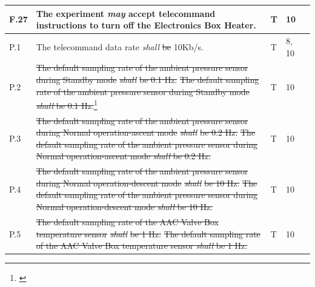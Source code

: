 \documentclass[a4paper,12pt,twoside]{article}
\providecommand{\DIFaddtex}[1]{{\protect\color{blue}\uwave{#1}}} %
\providecommand{\DIFdeltex}[1]{{\protect\color{red}\sout{#1}}}                      %
\providecommand{\DIFaddbegin}{} %
\providecommand{\DIFaddend}{} %
\providecommand{\DIFdelbegin}{} %
\providecommand{\DIFdelend}{} %
\providecommand{\DIFadd}[1]{\texorpdfstring{\DIFaddtex{#1}}{#1}} %
\providecommand{\DIFdel}[1]{\texorpdfstring{\DIFdeltex{#1}}{}} %
\newcommand{\DIFscaledelfig}{0.5}
\newlength{\DIFdelgraphicswidth} %
\newlength{\DIFdelgraphicsheight} %
\newcommand{\DIFaddincludegraphics}[2][]{{\color{blue}\fbox{\DIFOincludegraphics[#1]{#2}}}} %
\newcommand{\DIFdelincludegraphics}[2][]{%
\sbox{\DIFdelgraphicsbox}{\DIFOincludegraphics[#1]{#2}}%
\settoboxwidth{\DIFdelgraphicswidth}{\DIFdelgraphicsbox} %
\settoboxtotalheight{\DIFdelgraphicsheight}{\DIFdelgraphicsbox} %
\scalebox{\DIFscaledelfig}{%
\parbox[b]{\DIFdelgraphicswidth}{\usebox{\DIFdelgraphicsbox}\\[-\baselineskip] \rule{\DIFdelgraphicswidth}{0em}}\llap{\resizebox{\DIFdelgraphicswidth}{\DIFdelgraphicsheight}{%
\setlength{\unitlength}{\DIFdelgraphicswidth}%
\begin{picture}(1,1)%
\thicklines\linethickness{2pt} %
{\color[rgb]{1,0,0}\put(0,0){\framebox(1,1){}}}%
{\color[rgb]{1,0,0}\put(0,0){\line( 1,1){1}}}%
{\color[rgb]{1,0,0}\put(0,1){\line(1,-1){1}}}%
\end{picture}%
}\hspace*{3pt}}} %
} %
\DeclareRobustCommand{\DIFaddbegin}{\DIFOaddbegin \let\includegraphics\DIFaddincludegraphics} %
\DeclareRobustCommand{\DIFaddend}{\DIFOaddend \let\includegraphics\DIFOincludegraphics} %
\DeclareRobustCommand{\DIFdelbegin}{\DIFOdelbegin \let\includegraphics\DIFdelincludegraphics} %
\DeclareRobustCommand{\DIFdelend}{\DIFOaddend \let\includegraphics\DIFOincludegraphics} %
\begin{document}
\begin{longtable}[]{|m{}| m{} |m{} |m{}|m{}|}
F.27 & The experiment \textit{may} accept telecommand instructions to turn off the Electronics Box Heater.                                                                                   &      T        & 10            &        \\ \hline
P.1  & The telecommand data rate \textit{shall} \DIFdelbegin \DIFdel{be }\DIFdelend \DIFaddbegin \DIFadd{not be over }\DIFaddend 10Kb/s.                                                                                                                          &        T      & 8, 10            &        \\ \hline
P.2  & \DIFdelbegin \DIFdel{The default sampling rate of the ambient pressure sensor during Standby mode }\textit{\DIFdel{shall}} %
\DIFdel{be 0.1 Hz.                                                                           }\DIFdelend \DIFaddbegin \st{The default sampling rate of the ambient pressure sensor during Standby mode \textit{shall} be 0.1 Hz.}\footnote{\DIFadd{Replaced by P.23}\label{replaceSoftVeri}}                                                                       \DIFaddend &      T        & 10            &        \\ \hline
P.3  & \DIFdelbegin \DIFdel{The default sampling rate of the ambient pressure sensor during Normal operation-ascent mode }\textit{\DIFdel{shall}} %
\DIFdel{be 0.2 Hz.                                                           }\DIFdelend \DIFaddbegin \st{The default sampling rate of the ambient pressure sensor during Normal operation-ascent mode \textit{shall} be 0.2 Hz.}\DIFadd{\textsuperscript{\ref{replaceSoftVeri}}                                                           }\DIFaddend &      T        & 10            &        \\ \hline
P.4  & \DIFdelbegin \DIFdel{The default sampling rate of the ambient pressure sensor during Normal operation-descent mode }\textit{\DIFdel{shall}} %
\DIFdel{be 10 Hz.                                                           }\DIFdelend \DIFaddbegin \st{The default sampling rate of the ambient pressure sensor during Normal operation-descent mode \textit{shall} be 10 Hz.}\DIFadd{\textsuperscript{\ref{replaceSoftVeri}}                                                           }\DIFaddend &       T       & 10            &        \\ \hline
P.5  & \DIFdelbegin \DIFdel{The default sampling rate of the AAC Valve Box temperature sensor }\textit{\DIFdel{shall}} %
\DIFdel{be 1 Hz.                                                                                        }\DIFdelend \DIFaddbegin \st{The default sampling rate of the AAC Valve Box temperature sensor \textit{shall} be 1 Hz.}\DIFadd{\textsuperscript{\ref{replaceSoftVeri}}                                                                                        }\DIFaddend &      T        & 10            &        \\ \hline

\end{longtable}
\end{document}
